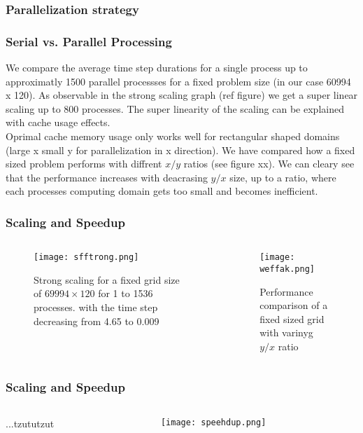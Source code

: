 \documentclass{beamer}
\begin{document}
%
%
%
\begin{frame}
\frametitle{Parallelization strategy}

\end{frame}
%
%
%
\begin{frame}
\frametitle{Serial vs. Parallel Processing}
\justify
We compare the average time step durations for a single process up to approximatly 1500 parallel processses for a fixed problem size (in our case 60994 x 120). As observable in the strong scaling graph (ref figure) we get a super linear scaling up to 800 processes. 
The super linearity of the scaling can be explained with cache usage effects. \\
\vspace{2mm}
Oprimal cache memory usage only works well for rectangular shaped domains (large x small y for parallelization in x direction). We have compared how a fixed sized problem performs with diffrent $x/y$ ratios (see figure xx). We can cleary see that the performance increases with deacrasing $y/x$ size, up to a ratio, where each processes computing domain gets too small and becomes inefficient. 
\end{frame}
%
%
%
\begin{frame}
\frametitle{Scaling and Speedup}
\begin{minipage}[1\textheight]{\textwidth}
\begin{columns}[T]
\begin{column}{0.5\textwidth}
\begin{figure}
\texttt{[image: sfftrong.png]}
\caption{Strong scaling for a fixed grid size of $69994\times 120$ for 1 to 1536 processes. with the time step decreasing from 4.65 to 0.009}
\end{figure}
\end{column}
\begin{column}{0.5\textwidth}
\begin{figure}
\texttt{[image: weffak.png]}
\caption{Performance comparison of a fixed sized grid with varinyg $y/x$ ratio}
\end{figure}
\end{column}
\end{columns}
\end{minipage}
\end{frame}
%
%
%
\begin{frame}
\frametitle{Scaling and Speedup}
\begin{minipage}[1\textheight]{\textwidth}
\begin{columns}[T]
\begin{column}{0.5\textwidth}
\vspace{5mm}
\justify
...tzututzut
\end{column}
\begin{column}{0.5\textwidth}
\begin{figure}
\texttt{[image: speehdup.png]}
\caption{}
\end{figure}
\end{column}
\end{columns}
\end{minipage}
\end{frame}
\end{document}
